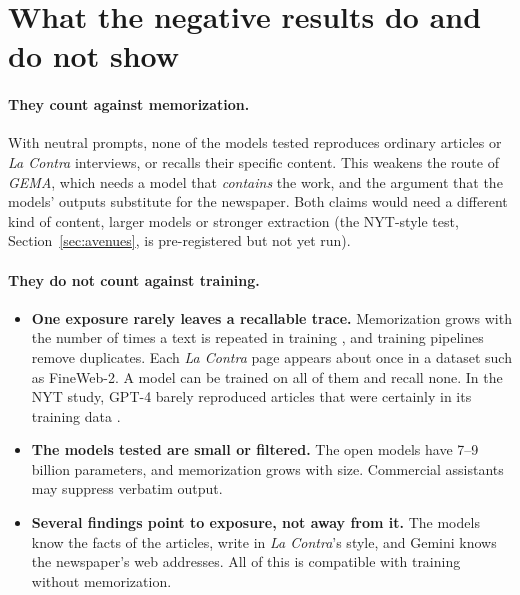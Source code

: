 \documentclass[10pt,a4paper]{article}
\begin{document}
\section{What the negative results do and do not show}\label{sec:negatives}
\paragraph{They count against memorization.} With neutral prompts, none of the models tested reproduces ordinary
articles or \emph{La Contra} interviews, or recalls their specific content. This weakens the route of
\emph{GEMA}, which needs a model that \emph{contains} the work, and the argument that the models' outputs substitute
for the newspaper. Both claims would need a different kind of content, larger models or stronger extraction
(the NYT-style test, Section~\ref{sec:avenues}, is pre-registered but not yet run).

\paragraph{They do not count against training.}
\begin{itemize}
\item \textbf{One exposure rarely leaves a recallable trace.} Memorization grows with the number of times a text is
repeated in training \cite{carlini2023}, and training pipelines remove duplicates. Each \emph{La Contra} page appears
about once in a dataset such as FineWeb-2. A model can be trained on all of them and recall none. In the NYT study,
GPT-4 barely reproduced articles that were certainly in its training data \cite{freeman2024}.
\item \textbf{The models tested are small or filtered.} The open models have 7--9 billion parameters, and memorization
grows with size. Commercial assistants may suppress verbatim output.
\item \textbf{Several findings point to exposure, not away from it.} The models know the facts of the articles, write
in \emph{La Contra}'s style, and Gemini knows the newspaper's web addresses. All of this is compatible with training
without memorization.
\end{itemize}
\end{document}

